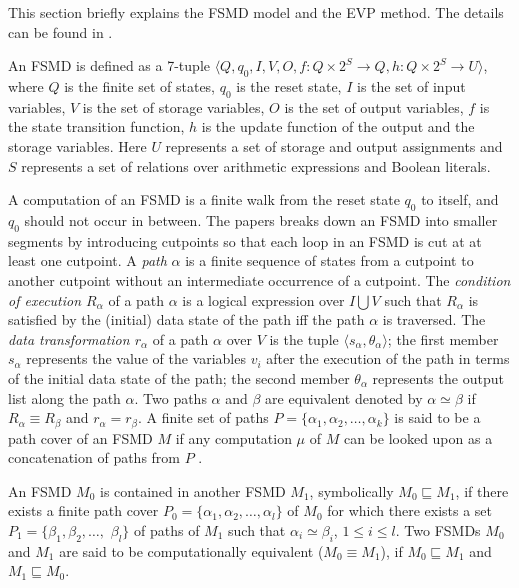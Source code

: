 This section briefly explains the FSMD model and the EVP method\cite{Chouksey18}.
The details can be found in \cite{Chouksey18,Banerjee14}.

An FSMD is defined as a 7-tuple $\langle Q, q_0, I, V, O, f:Q\times 2^S \rightarrow Q,
h:Q\times 2^S \rightarrow U \rangle$, where $Q$ is the finite set of
states, $q_0$ is the reset state, $I$ is the set of input variables, $V$ is the
set of storage variables, $O$ is the set of output variables, $f$ is the state
transition function, $h$ is the update function of the output and the storage
variables. Here $U$ represents a set of storage and output assignments and $S$
represents a set of relations over arithmetic expressions and Boolean literals.

A computation of an FSMD is a finite walk from the reset state $q_0$ to itself,
and $q_0$ should not occur in between.  The papers \cite{Chouksey18,Banerjee14}
breaks down an FSMD into smaller segments by introducing cutpoints so that each
loop in an FSMD is cut at at least one cutpoint.  A {\em path} $\alpha $ is a
finite sequence of states from a cutpoint to another cutpoint without an
intermediate occurrence of a cutpoint.  The {\em condition of execution
$R_{\alpha}$} of a path $\alpha$ is a logical expression over $I \bigcup V$
such that $R_\alpha$ is satisfied by the (initial) data state of the path iff
the path $\alpha$ is traversed.  The {\em data transformation $r_{\alpha}$} of
a path $\alpha$ over $V$ is the tuple $\langle s_\alpha, \theta_\alpha
\rangle$; the first member $s_\alpha$ represents the value of the variables
$v_i$ after the execution of the path in terms of the initial data state of the
path; the second member $\theta_\alpha$ represents the output list along the
path $\alpha$. Two paths $\alpha$ and $\beta$ are equivalent denoted by
$\alpha\simeq\beta$ if $R_{\alpha}\equiv R_{\beta}$ and $r_{\alpha}=r_{\beta}$.
A finite set of paths $P=\{ \alpha_1, \alpha_2, \ldots, \alpha_k \}$ is said to
be a path cover of an FSMD $M$ if any computation $\mu$ of $M$ can be looked
upon as a concatenation of paths from $P$ \cite{Floyd67}. 

An FSMD $M_0$ is contained in another FSMD $M_1$, symbolically $M_0 \sqsubseteq
M_1$, if there exists a finite path cover $P_0=\{ \alpha_1, \alpha_2, \ldots,
\alpha_l \}$ of $M_0$ for which there exists a set $P_1 = \{ \beta_1, \beta_2,
\ldots,$ $\beta_l \}$ of paths of $M_1$ such that $\alpha_i \simeq \beta_i$,
$1\leq i \leq l$.  Two FSMDs $M_0$ and $M_1$ are said to be
computationally equivalent ($M_0 \equiv M_1$), if $M_0 \sqsubseteq M_1$ and
$M_1 \sqsubseteq M_0$.

